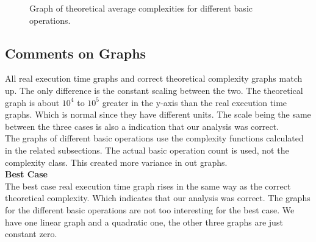 \documentclass[10pt]{article}
\begin{document}
\begin{figure}[H]
\centering
{}
\caption{Graph of theoretical average complexities for different basic operations.}
\end{figure}

\newpage
\subsection{Comments on Graphs}

\indent \indent All real execution time graphs and correct theoretical complexity graphs match up. The only difference is the constant scaling between the two. The theoretical graph is about $10^4$ to $10^5$ greater in the y-axis than the real execution time graphs. Which is normal since they have different units. The scale being the same between the three cases is also a indication that our analysis was correct. \\ 
\indent The graphs of different basic operations use the complexity functions calculated in the related subsections. The actual basic operation count is used, not the complexity class. This created more variance in out graphs. \\

\textbf{Best Case} \\
\indent The best case real execution time graph rises in the same way as the correct theoretical complexity. Which indicates that our analysis was correct. The graphs for the different basic operations are not too interesting for the best case. We have one linear graph and a quadratic one, the other three graphs are just constant zero. \\
\end{document}
